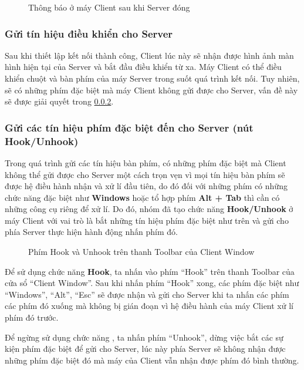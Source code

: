 \begin{figure}[H]
	\caption{Thông báo ở máy Client sau khi Server đóng}
	\label{fig:ScreenshotsDirectory}
\end{figure}

\subsubsection{Gửi tín hiệu điều khiển cho Server}
Sau khi thiết lập kết nối thành công, Client lúc này sẽ nhận được hình ảnh màn hình hiện tại của Server và bắt đầu điều khiển từ xa. Máy Client có thể điều khiển chuột và bàn phím của máy Server trong suốt quá trình kết nối. Tuy nhiên, sẽ có những phím đặc biệt mà máy Client không gửi được cho Server, vấn đề này sẽ được giải quyết trong \ref{sec:HookUnhookSection}.

\subsubsection{Gửi các tín hiệu phím đặc biệt đến cho Server (nút Hook/Unhook)}\label{sec:HookUnhookSection}
Trong quá trình gửi các tín hiệu bàn phím, có những phím đặc biệt mà Client không thể gửi được cho Server một cách trọn vẹn vì mọi tín hiệu bàn phím sẽ được hệ điều hành nhận và xử lí đầu tiên, do đó đối với những phím có những chức năng đặc biệt như \textbf{Windows} hoặc tổ hợp phím \textbf{Alt + Tab} thì cần có những công cụ riêng để xử lí. Do đó, nhóm đã tạo chức năng \textbf{Hook/Unhook} ở máy Client với vai trò là bắt những tín hiệu phím đặc biệt như trên và gửi cho phía Server thực hiện hành động nhấn phím đó.

\begin{figure}[H]
	\caption{Phím Hook và Unhook trên thanh Toolbar của Client Window}
	\label{fig:HookUnHookButtons}
\end{figure}

Để sử dụng chức năng \textbf{Hook}, ta nhấn vào phím ``Hook'' trên thanh Toolbar của cửa sổ ``Client Window''. Sau khi nhấn phím ``Hook'' xong, các phím đặc biệt như ``Windows'', ``Alt'', ``Esc'' sẽ được nhận và gửi cho Server khi ta nhấn các phím các phím đó xuống mà không bị gián đoạn vì hệ điều hành của máy Client xử lí phím đó trước.

Để ngừng sử dụng chức năng , ta nhấn phím ``Unhook'', dừng việc bắt các sự kiện phím đặc biệt để gửi cho Server, lúc này phía Server sẽ không nhận được những phím đặc biệt đó mà máy của Client vẫn nhận được phím đó bình thường.